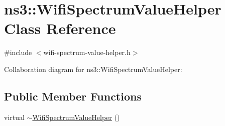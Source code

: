 \hypertarget{classns3_1_1WifiSpectrumValueHelper}{}\section{ns3\+:\+:Wifi\+Spectrum\+Value\+Helper Class Reference}
\label{classns3_1_1WifiSpectrumValueHelper}


{\ttfamily \#include $<$wifi-\/spectrum-\/value-\/helper.\+h$>$}



Collaboration diagram for ns3\+:\+:Wifi\+Spectrum\+Value\+Helper\+:
\subsection*{Public Member Functions}
\begin{DoxyCompactItemize}
\item 
virtual \hyperlink{classns3_1_1WifiSpectrumValueHelper_a09aa51538e1b82c261e0b3f08fbdd802}{$\sim$\+Wifi\+Spectrum\+Value\+Helper} ()
\end{DoxyCompactItemize}
